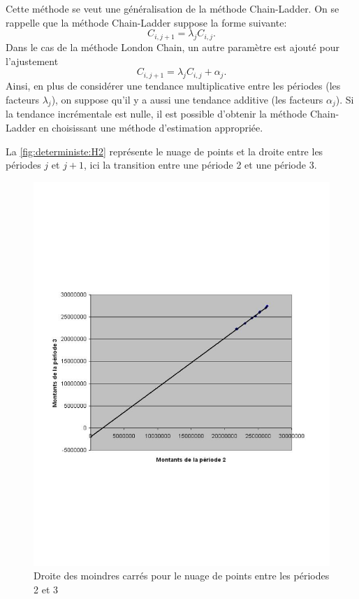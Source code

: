 Cette méthode se veut une généralisation de la méthode Chain-Ladder.
On se rappelle que la méthode Chain-Ladder suppose la forme suivante:
\begin{equation*}
  C_{i,j+1} = \lambda_j C_{i,j}.
\end{equation*}
Dans le cas de la méthode London Chain, un autre paramètre est ajouté
pour l'ajustement
\begin{equation*}
  C_{i,j+1} = \lambda_j C_{i,j} + \alpha_j.
\end{equation*}
Ainsi, en plus de considérer une tendance multiplicative entre les
périodes (les facteurs $\lambda_j$), on suppose qu'il y a aussi une
tendance additive (les facteurs $\alpha_j$). Si la tendance
incrémentale est nulle, il est possible d'obtenir la méthode
Chain-Ladder en choisissant une méthode d'estimation appropriée.

La \autoref{fig:deterministe:H2} représente le nuage de points et la
droite entre les périodes $j$ et $j+1$, ici la transition entre une
période 2 et une période 3.

\begin{figure}
  \centering
  \includegraphics{images/H2}
  \caption{Droite des moindres carrés pour le nuage de points entre
    les périodes 2 et 3}
  \label{fig:deterministe:H2}
\end{figure}

